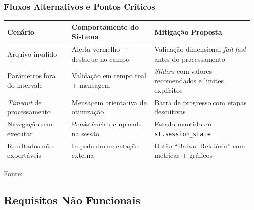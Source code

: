 \newpage
\subsubsection{Fluxos Alternativos e Pontos Críticos}
\label{ssubsec:pontos-criticos}

\begin{quadro}[ht]
\begin{center}
\small
\captionsetup{justification=centering, labelsep=endash, width=0.75\linewidth}
\caption{Tratamento de exceções e usabilidade}
\label{quadro:excecoes}
\begin{threeparttable}
\begin{tabularx}{\textwidth}{|l|X|X|} \hline
\textbf{Cenário} & \textbf{Comportamento do Sistema} & \textbf{Mitigação Proposta} \\ \hline
Arquivo inválido & Alerta vermelho + destaque no campo & Validação dimensional \textit{fail-fast} antes do processamento \\ \hline
Parâmetros fora do intervalo & Validação em tempo real + mensagem & \textit{Sliders} com valores recomendados e limites explícitos \\ \hline
\textit{Timeout} de processamento & Mensagem orientativa de otimização & Barra de progresso com etapas descritivas \\ \hline
Navegação sem executar & Persistência de uploads na sessão & Estado mantido em \texttt{st.session\_state} \\ \hline
Resultados não exportáveis & Impede documentação externa & Botão ``Baixar Relatório'' com métricas + gráficos \\ \hline
\end{tabularx}
\begin{tablenotes}[flushleft]
\footnotesize
\item Fonte:~\oautor
\end{tablenotes}
\end{threeparttable}
\end{center}
\end{quadro}

\subsection{Requisitos Não Funcionais}
\label{subsec:nao-funcionais}

